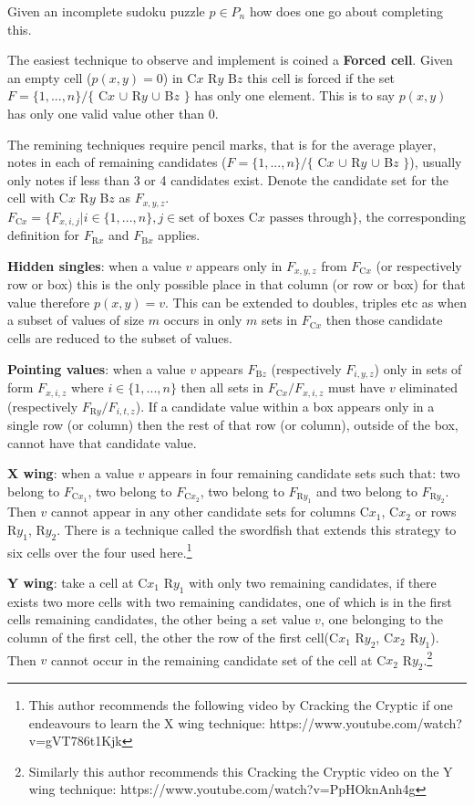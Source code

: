 \documentclass[a4paper,11pt]{report}
\newcounter{row}
\newcounter{col}
\begin{document}
Given an incomplete sudoku puzzle $p\in P_n$ how does one go about completing this.

The easiest technique to observe and implement is coined a \textbf{Forced cell}. Given an empty cell ($p(x,y)=0$) in C$x$ R$y$ B$z$ this cell is forced if the set $F=\{1,...,n\} / \{$ C$x$ $\cup$ R$y$ $\cup$ B$z$ $\}$ has only one element. This is to say $p(x,y)$ has only one valid value other than 0. 

The remining techniques require pencil marks, that is for the average player, notes in each of remaining candidates ($F=\{1,...,n\} / \{$ C$x$ $\cup$ R$y$ $\cup$ B$z$ $\}$), usually only notes if less than 3 or 4 candidates exist. Denote the candidate set for the cell with C$x$ R$y$ B$z$ as $F_{x,y,z}$. $F_{\text{C}x} = \{F_{x,i,j}|i\in\{1,...,n\}, j \in \text{set of boxes C$x$ passes through}\}$, the corresponding definition for $F_{\text{R}x}$ and $F_{\text{B}x}$ applies.

\textbf{Hidden singles}: when a value $v$ appears only in $F_{x,y,z}$ from $F_{\text{C}x}$ (or respectively row or box) this is the only possible place in that column (or row or box) for that value therefore $p(x,y)=v$. This can be extended to doubles, triples etc as when a subset of values of size $m$ occurs in only $m$ sets in $F_{\text{C}x}$ then those candidate cells are reduced to the subset of values.

\textbf{Pointing values}: when a value $v$ appears $F_{\text{B}z}$ (respectively $F_{i,y,z}$) only in sets of form $F_{x,i,z}$ where $i\in \{1,...,n\}$ then all sets in $F_{\text{C}x}/F_{x,i,z}$ must have $v$ eliminated (respectively $F_{\text{R}y}/F_{i,t,z}$). If a candidate value within a box appears only in a single row (or column) then the rest of that row (or column), outside of the box, cannot have that candidate value.

\textbf{X wing}: when a value $v$ appears in four remaining candidate sets such that: two belong to $F_{\text{C}x_1}$, two belong to $F_{\text{C}x_2}$, two belong to $F_{\text{R}y_1}$ and two belong to $F_{\text{R}y_2}$. Then $v$ cannot appear in any other candidate sets for columns C$x_1$, C$x_2$ or rows R$y_1$, R$y_2$. There is a technique called the swordfish that extends this strategy to six cells over the four used here.\footnote{This author recommends the following video by Cracking the Cryptic if one endeavours to learn the X wing technique: https://www.youtube.com/watch?v=gVT786t1Kjk}

\textbf{Y wing}: take a cell at C$x_1$ R$y_1$ with only two remaining candidates, if there exists two more cells with two remaining candidates, one of which is in the first cells remaining candidates, the other being a set value $v$, one belonging to the column of the first cell, the other the row of the first cell(C$x_1$ R$y_2$, C$x_2$ R$y_1$). Then $v$ cannot occur in the remaining candidate set of the cell at C$x_2$ R$y_2$.\footnote{Similarly this author recommends this Cracking the Cryptic video on the Y wing technique: https://www.youtube.com/watch?v=PpHOknAnh4g}
\end{document}
